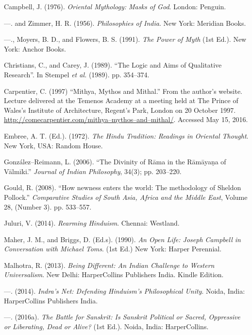 \begin{thebibliography}{99}
 Campbell, J. (1976). \textit{Oriental Mythology: Masks of God}. London: Penguin.

  —. and Zimmer, H. R. (1956). \textit{Philosophies of India}. New York: Meridian Books.

  —., Moyers, B. D., and Flowers, B. S. (1991). \textit{The Power of Myth} (1st Ed.). New York: Anchor Books.

  Christians, C., and Carey, J. (1989). “The Logic and Aims of Qualitative Research”. In Stempel \textit{et al.} (1989). pp. 354–374.

  Carpentier, C. (1997) “Mithya, Mythos and Mithal.” From the author’s website. Lecture delivered at the Temenos Academy at a meeting held at The Prince of Wales's Institute of Architecture, Regent's Park, London on 20 October 1997. \url{http://comecarpentier.com/mithya–mythos–and–mithal/}. Accessed May 15, 2016.

  Embree, A. T. (Ed.). (1972). \textit{The Hindu Tradition: Readings in Oriental Thought}. New York, USA: Random House.

  González–Reimann, L. (2006). “The Divinity of Rāma in the Rāmāyaṇa of Vālmīki.” \textit{Journal of Indian Philosophy}, 34(3); pp. 203–220.

  Gould, R. (2008). “How newness enters the world: The methodology of Sheldon Pollock.” \textit{Comparative Studies of South Asia, Africa and the Middle East}, Volume 28, (Number 3). pp. 533–557.

  Juluri, V. (2014). \textit{Rearming Hinduism}. Chennai: Westland.

  Maher, J. M., and Briggs, D. (Ed.s). (1990). \textit{An Open Life: Joseph Campbell in Conversation with Michael Toms}. (1st Ed.) New York: Harper Perennial.

  Malhotra, R. (2013). \textit{Being Different: An Indian Challenge to Western Universalism}. New Delhi: HarperCollins Publishers India. Kindle Edition.

  —. (2014). \textit{Indra’s Net: Defending Hinduism’s Philosophical Unity}. Noida, India: HarperCollins Publishers India.

  —. (2016a). \textit{The Battle for Sanskrit: Is Sanskrit Political or Sacred, Oppressive or Liberating, Dead or Alive?} (1st Ed.). Noida, India: HarperCollins.


\end{thebibliography}
